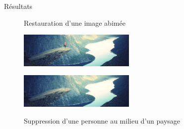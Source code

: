 \documentclass[final,hyperref={pdfpagelabels=false}]{beamer}
\begin{document}
\begin{frame}[t]
\begin{columns}[t]
\begin{column}{.465\textwidth}
\begin{block}{\Large Résultats}
\begin{figure}[H]
\centering
{}
\caption{Restauration d'une image abimée}
\end{figure}
\begin{figure}[H]
\includegraphics[width=0.5\textwidth]{figures/trolltunga.jpg}\label{fig:troll}
\end{figure}
\begin{figure}[H]
\includegraphics[width=0.5\textwidth]{figures/resultTroll9.png}\label{fig:trollb}
\caption{Suppression d'une personne au milieu d'un paysage}
\end{figure}



\end{block}
\end{column}
\end{columns}
\end{frame}
\end{document}
